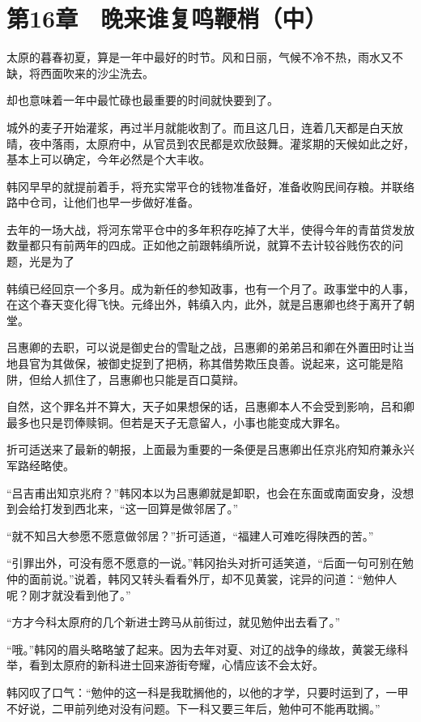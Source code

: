 \section{第16章　晚来谁复鸣鞭梢（中）}

太原的暮春初夏，算是一年中最好的时节。风和日丽，气候不冷不热，雨水又不缺，将西面吹来的沙尘洗去。

却也意味着一年中最忙碌也最重要的时间就快要到了。

城外的麦子开始灌浆，再过半月就能收割了。而且这几日，连着几天都是白天放晴，夜中落雨，太原府中，从官员到农民都是欢欣鼓舞。灌浆期的天候如此之好，基本上可以确定，今年必然是个大丰收。

韩冈早早的就提前着手，将充实常平仓的钱物准备好，准备收购民间存粮。并联络路中仓司，让他们也早一步做好准备。

去年的一场大战，将河东常平仓中的多年积存吃掉了大半，使得今年的青苗贷发放数量都只有前两年的四成。正如他之前跟韩缜所说，就算不去计较谷贱伤农的问题，光是为了

韩缜已经回京一个多月。成为新任的参知政事，也有一个月了。政事堂中的人事，在这个春天变化得飞快。元绛出外，韩缜入内，此外，就是吕惠卿也终于离开了朝堂。

吕惠卿的去职，可以说是御史台的雪耻之战，吕惠卿的弟弟吕和卿在外置田时让当地县官为其做保，被御史捉到了把柄，称其借势欺压良善。说起来，这可能是陷阱，但给人抓住了，吕惠卿也只能是百口莫辩。

自然，这个罪名并不算大，天子如果想保的话，吕惠卿本人不会受到影响，吕和卿最多也只是罚俸赎铜。但若是天子无意留人，小事也能变成大罪名。

折可适送来了最新的朝报，上面最为重要的一条便是吕惠卿出任京兆府知府兼永兴军路经略使。

“吕吉甫出知京兆府？”韩冈本以为吕惠卿就是卸职，也会在东面或南面安身，没想到会给打发到西北来，“这一回算是做邻居了。”

“就不知吕大参愿不愿意做邻居？”折可适道，“福建人可难吃得陕西的苦。”

“引罪出外，可没有愿不愿意的一说。”韩冈抬头对折可适笑道，“后面一句可别在勉仲的面前说。”说着，韩冈又转头看看外厅，却不见黄裳，诧异的问道：“勉仲人呢？刚才就没看到他了。”

“方才今科太原府的几个新进士跨马从前街过，就见勉仲出去看了。”

“哦。”韩冈的眉头略略皱了起来。因为去年对夏、对辽的战争的缘故，黄裳无缘科举，看到太原府的新科进士回来游街夸耀，心情应该不会太好。

韩冈叹了口气：“勉仲的这一科是我耽搁他的，以他的才学，只要时运到了，一甲不好说，二甲前列绝对没有问题。下一科又要三年后，勉仲可不能再耽搁。”

